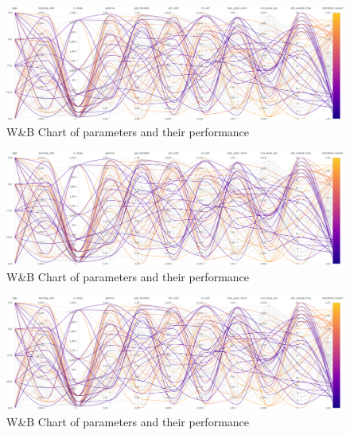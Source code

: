 \documentclass[../xlapes02]{subfiles}
\begin{document}
    \newpage
    \begin{figure}[h!]
        \centering
        \includegraphics[width=\linewidth, height=0.2\paperheight]{image/wandb/wb1}
        \caption{W\&B Chart of parameters and their performance}
        \label{fig:wb-chart1}
    \end{figure}
    \begin{figure}[h!]
        \centering
        \includegraphics[width=\linewidth, height=0.2\paperheight]{image/wandb/wb1}
        \caption{W\&B Chart of parameters and their performance}
        \label{fig:wb-chart2}
    \end{figure}
    \begin{figure}[h!]
        \centering
        \includegraphics[width=\linewidth, height=0.2\paperheight]{image/wandb/wb1}
        \caption{W\&B Chart of parameters and their performance}
        \label{fig:wb-chart3}
    \end{figure}
\end{document}
